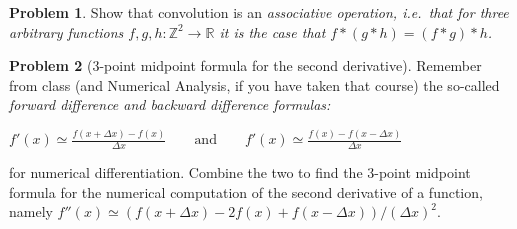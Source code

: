 \documentclass[11pt]{article}
\theoremstyle{plain}
\theoremstyle{definition}
\newtheorem{problem}{Problem}
\theoremstyle{remark}
\begin{document}
\begin{problem}
	\label{assoc}
Show that convolution is an \em associative \em operation,
i.e.~that for three arbitrary functions $f,g,h:\mathbb{Z}^2\rightarrow\mathbb{R}$ it is the case that 
$f*(g*h)=(f*g)*h$.
\end{problem}
\begin{problem}[3-point midpoint formula for the second derivative]
\label{sder}
Remember from class (and Numerical Analysis, if you have taken that course) the so-called \em forward difference \em 
and \em backward difference \em formulas: 
\par\vspace{.1cm}
\hfill
$
\displaystyle
f'(x)\simeq\frac{f(x+\Delta x)-f(x)}{\Delta x}
\qquad
\mbox{and}
\qquad
f'(x)\simeq\frac{f(x)-f(x-\Delta x)}{\Delta x}
$
\hfill\mbox{}\par\vspace{.1cm}
for numerical differentiation. 
Combine the two to find the 3-point midpoint formula
for the numerical computation of the second derivative
of a function,
namely
$f''(x)\simeq(f(x+\Delta x)-2f(x)+f(x-\Delta x))/(\Delta x)^2$.
\end{problem}
\end{document}
